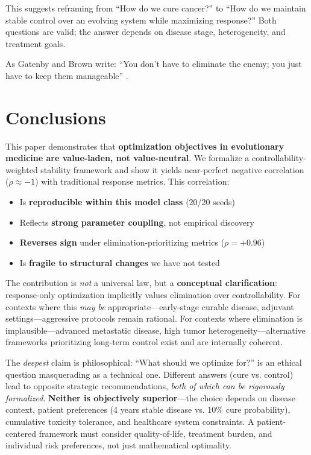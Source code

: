 \documentclass[11pt,a4paper]{article}
\begin{document}
This suggests reframing from ``How do we cure cancer?'' to ``How do we maintain stable control over an evolving system while maximizing response?'' Both questions are valid; the answer depends on disease stage, heterogeneity, and treatment goals.

As Gatenby and Brown write: ``You don't have to eliminate the enemy; you just have to keep them manageable'' \citep{gatenby2009adaptive}.

\section{Conclusions}

This paper demonstrates that \textbf{optimization objectives in evolutionary medicine are value-laden, not value-neutral}. We formalize a controllability-weighted stability framework and show it yields near-perfect negative correlation ($\rho \approx -1$) with traditional response metrics. This correlation:

\begin{itemize}
    \item Is \textbf{reproducible within this model class} (20/20 seeds)
    \item Reflects \textbf{strong parameter coupling}, not empirical discovery
    \item \textbf{Reverses sign} under elimination-prioritizing metrics ($\rho = +0.96$)
    \item Is \textbf{fragile to structural changes} we have not tested
\end{itemize}

The contribution is \textit{not} a universal law, but a \textbf{conceptual clarification}: response-only optimization implicitly values elimination over controllability. For contexts where this \textit{may be} appropriate---early-stage curable disease, adjuvant settings---aggressive protocols remain rational. For contexts where elimination is implausible---advanced metastatic disease, high tumor heterogeneity---alternative frameworks prioritizing long-term control exist and are internally coherent.

The \textit{deepest} claim is philosophical: ``What should we optimize for?'' is an ethical question masquerading as a technical one. Different answers (cure vs. control) lead to opposite strategic recommendations, \textit{both of which can be rigorously formalized}. \textbf{Neither is objectively superior}---the choice depends on disease context, patient preferences (4 years stable disease vs. 10\% cure probability), cumulative toxicity tolerance, and healthcare system constraints. A patient-centered framework must consider quality-of-life, treatment burden, and individual risk preferences, not just mathematical optimality.
\end{document}
